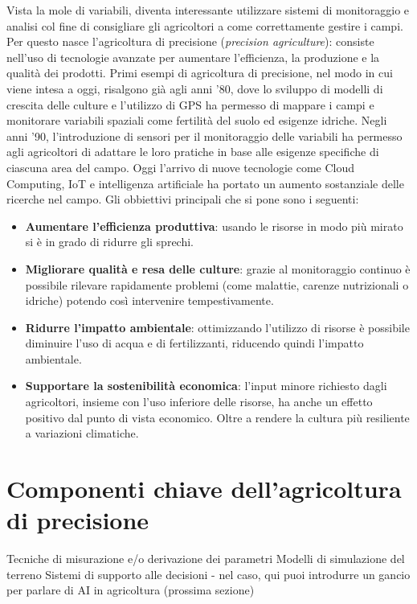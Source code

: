 \documentclass[12pt,a4paper,openright,twoside]{book}
\begin{document}
Vista la mole di variabili, diventa interessante utilizzare sistemi di monitoraggio e analisi col fine di consigliare gli agricoltori a come correttamente gestire i campi. Per questo nasce l'agricoltura di precisione (\textit{precision agriculture}): consiste nell'uso di tecnologie avanzate per aumentare l'efficienza, la produzione e la qualità dei prodotti.
Primi esempi di agricoltura di precisione, nel modo in cui viene intesa a oggi, risalgono già agli anni '80, dove lo sviluppo di modelli di crescita delle culture e l'utilizzo di \ac{GPS} ha permesso di mappare i campi e monitorare variabili spaziali come fertilità del suolo ed esigenze idriche.
Negli anni '90, l'introduzione di sensori per il monitoraggio delle variabili ha permesso agli agricoltori di adattare le loro pratiche in base alle esigenze specifiche di ciascuna area del campo.
Oggi l'arrivo di nuove tecnologie come Cloud Computing, \ac{IoT} e intelligenza artificiale ha portato un aumento sostanziale delle ricerche nel campo.
Gli obbiettivi principali che si pone sono i seguenti:
\begin{itemize}
    \item \textbf{Aumentare l'efficienza produttiva}: usando le risorse in modo più mirato si è in grado di ridurre gli sprechi.
    \item \textbf{Migliorare qualità e resa delle culture}: grazie al monitoraggio continuo è possibile rilevare rapidamente problemi (come malattie, carenze nutrizionali o idriche) potendo così intervenire tempestivamente.
    \item \textbf{Ridurre l'impatto ambientale}: ottimizzando l'utilizzo di risorse è possibile diminuire l'uso di acqua e di fertilizzanti, riducendo quindi l'impatto ambientale.
    \item \textbf{Supportare la sostenibilità economica}: l'input minore richiesto dagli agricoltori, insieme con l'uso inferiore delle risorse, ha anche un effetto positivo dal punto di vista economico. Oltre a rendere la cultura più resiliente a variazioni climatiche.
\end{itemize}

\section{Componenti chiave dell’agricoltura di precisione}
\label{componenti-chiave}
Tecniche di misurazione e/o derivazione dei parametri
Modelli di simulazione del terreno
Sistemi di supporto alle decisioni - nel caso, qui puoi introdurre un gancio per parlare di AI in agricoltura (prossima sezione)
\end{document}
